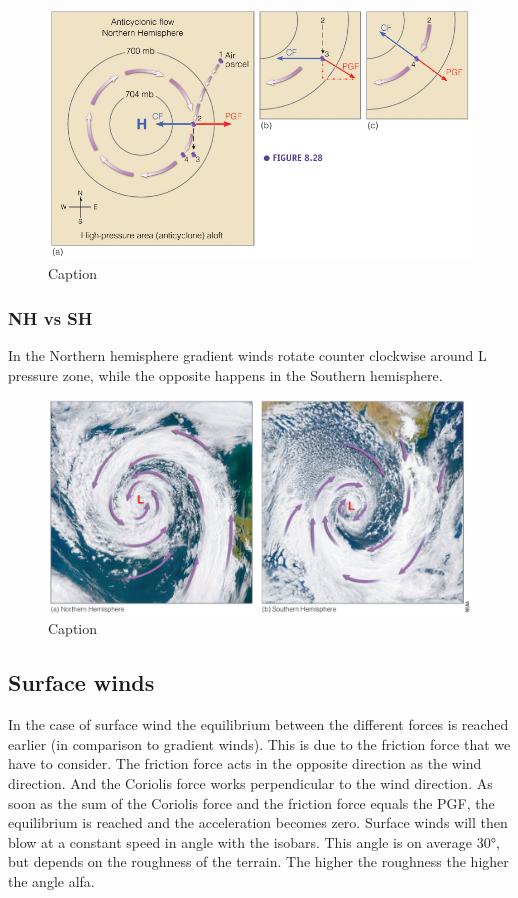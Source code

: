 \documentclass[oneside]{book}
\begin{document}
\begin{figure}

{\centering \includegraphics[width=0.4\linewidth]{figures/Figure411} 

}

\caption{Caption}\label{fig:ACF}
\end{figure}

\subsubsection{NH vs SH}\label{nh-vs-sh}

In the Northern hemisphere gradient winds rotate counter clockwise
around L pressure zone, while the opposite happens in the Southern
hemisphere.

\begin{figure}

{\centering \includegraphics[width=0.4\linewidth]{figures/Figure412} 

}

\caption{Caption}\label{fig:NHSH}
\end{figure}

\subsection{Surface winds}\label{surface-winds}

In the case of surface wind the equilibrium between the different forces
is reached earlier (in comparison to gradient winds). This is due to the
friction force that we have to consider. The friction force acts in the
opposite direction as the wind direction. And the Coriolis force works
perpendicular to the wind direction. As soon as the sum of the Coriolis
force and the friction force equals the PGF, the equilibrium is reached
and the acceleration becomes zero. Surface winds will then blow at a
constant speed in angle with the isobars. This angle is on average 30°,
but depends on the roughness of the terrain. The higher the roughness
the higher the angle alfa.
\end{document}
